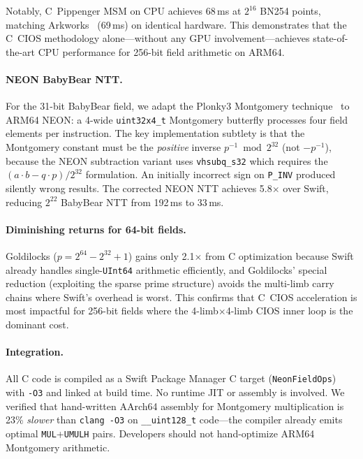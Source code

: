 Notably, C~Pippenger MSM on CPU achieves 68\,ms at $2^{16}$ BN254 points,
matching Arkworks~\cite{arkworks} (69\,ms) on identical hardware. This
demonstrates that the C~CIOS methodology alone---without any GPU
involvement---achieves state-of-the-art CPU performance for 256-bit field
arithmetic on ARM64.

\paragraph{NEON BabyBear NTT.}
For the 31-bit BabyBear field, we adapt the Plonky3 Montgomery
technique~\cite{plonky3} to ARM64 NEON: a 4-wide \texttt{uint32x4\_t}
Montgomery butterfly processes four field elements per instruction. The key
implementation subtlety is that the Montgomery constant must be the
\emph{positive} inverse $p^{-1} \bmod 2^{32}$ (not $-p^{-1}$), because the
NEON subtraction variant uses \texttt{vhsubq\_s32} which requires the
$(a \cdot b - q \cdot p)/2^{32}$ formulation. An initially incorrect sign on
\texttt{P\_INV} produced silently wrong results. The corrected NEON NTT achieves
5.8$\times$ over Swift, reducing $2^{22}$ BabyBear NTT from 192\,ms to 33\,ms.

\paragraph{Diminishing returns for 64-bit fields.}
Goldilocks ($p = 2^{64} - 2^{32} + 1$) gains only 2.1$\times$ from C
optimization because Swift already handles single-\texttt{UInt64} arithmetic
efficiently, and Goldilocks' special reduction (exploiting the sparse prime
structure) avoids the multi-limb carry chains where Swift's overhead is worst.
This confirms that C~CIOS acceleration is most impactful for 256-bit fields
where the 4-limb$\times$4-limb CIOS inner loop is the dominant cost.

\paragraph{Integration.}
All C code is compiled as a Swift Package Manager C target
(\texttt{NeonFieldOps}) with \texttt{-O3} and linked at build time. No
runtime JIT or assembly is involved. We verified that hand-written AArch64
assembly for Montgomery multiplication is 23\% \emph{slower} than
\texttt{clang~-O3} on \texttt{\_\_uint128\_t} code---the compiler already emits
optimal \texttt{MUL}+\texttt{UMULH} pairs. Developers should not hand-optimize
ARM64 Montgomery arithmetic.
